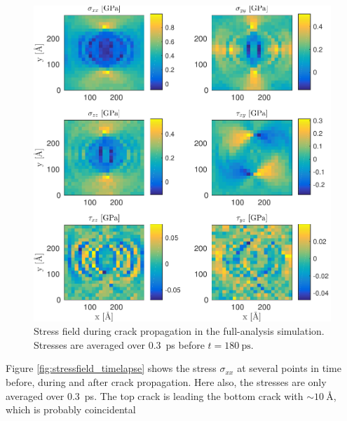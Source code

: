 \begin{figure}
\includegraphics[width=\textwidth]{../figures/thesis/stressfield_snap_propagation_180.pdf}
\caption{Stress field during crack propagation in the full-analysis simulation. Stresses are averaged over \SI{0.3}{\pico\second} before $t = \SI{180}{\pico\second}$.}
\label{fig:stressfield_snap_propagation_180}
\end{figure}

Figure \ref{fig:stressfield_timelapse} shows the stress $\sigma_{xx}$ at several points in time before, during and after crack propagation. Here also, the stresses are only averaged over \SI{0.3}{\pico\second}. The top crack is leading the bottom crack with $\sim \SI{10}{\angstrom}$, which is probably coincidental


